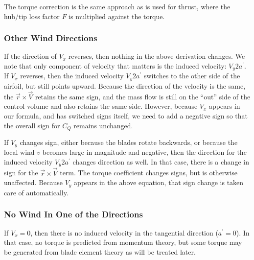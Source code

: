 The torque correction is the same approach as is used for thrust, where the hub/tip loss factor $F$ is multiplied against the torque.

\subsubsection{Other Wind Directions}

If the direction of $V_x$ reverses, then nothing in the above derivation changes.  We note that only component of velocity that matters is the induced velocity: $V_y 2 a^\prime$.  If $V_x$ reverses, then the induced velocity $V_y 2 a^\prime$ switches to the other side of the airfoil, but still points upward.  Because the direction of the velocity is the same, the $\vec{r} \times \vec{V}$ retains the same sign, and the mass flow is still on the ``out'' side of the control volume and also retains the same side.  However, because $V_x$ appears in our formula, and has switched signs itself, we need to add a negative sign so that the overall sign for $C_Q$ remains unchanged.


If $V_y$ changes sign, either because the blades rotate backwards, or because the local wind $v$ becomes large in magnitude and negative, then the direction for the induced velocity $V_y 2 a^\prime$ changes direction as well.  In that case, there is a change in sign for the $\vec{r} \times \vec{V}$ term.  The torque coefficient changes signs, but is otherwise unaffected.  Because $V_y$ appears in the above equation, that sign change is taken care of automatically.

\subsubsection{No Wind In One of the Directions}

If $V_x = 0$, then there is no induced velocity in the tangential direction ($a^\prime = 0$).  In that case, no torque is predicted from momentum theory, but some torque may be generated from blade element theory as will be treated later.

